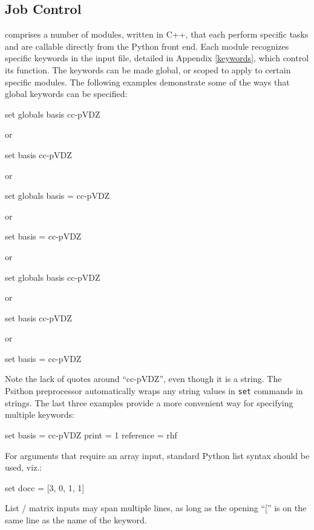 \subsection{Job Control}
\PSIfour comprises a number of modules, written in C++, that each perform
specific tasks and are callable directly from the Python front end. Each module
recognizes specific keywords in the input file, detailed in Appendix \ref{keywords}, which
control its function. The keywords can be made global, or scoped to apply to
certain specific modules. The following examples demonstrate some of the ways
that global keywords can be specified:
\begin{Snippet}
set globals basis cc-pVDZ

 or

set basis cc-pVDZ

 or

set globals basis = cc-pVDZ

 or

set basis = cc-pVDZ

 or

set globals{
  basis cc-pVDZ
}

 or

set{
  basis cc-pVDZ
}

 or

set{
  basis = cc-pVDZ
}
\end{Snippet}
Note the lack of quotes around ``cc-pVDZ'', even though it is a string. The
Psithon preprocessor automatically wraps any string values in {\tt set} commands in
strings. The last three examples provide a more convenient way for specifying
multiple keywords:
\begin{Snippet}
set{
  basis = cc-pVDZ
  print = 1
  reference = rhf
}
\end{Snippet}
For arguments that require an array input, standard Python list syntax should
be used, viz.:
\begin{Snippet}
set{
  docc = [3, 0, 1, 1]
}
\end{Snippet}
List / matrix inputs may span multiple lines, as long as the opening ``['' is
on the same line as the name of the keyword.

